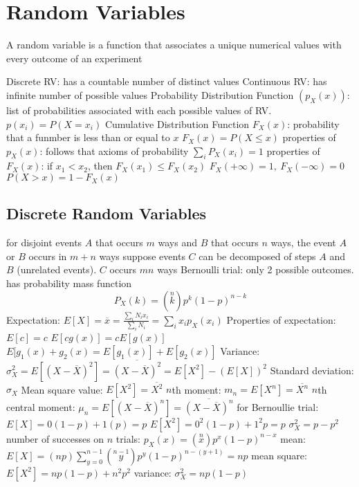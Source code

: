 \documentclass[a4paper,11pt]{article}
\begin{document}
	\section{Random Variables}
	A random variable is a function that associates a unique numerical values with every outcome of an experiment
	\begin{outline}[enumerate]
		\1 Discrete RV: has a countable number of distinct values
		\1 Continuous RV: has infinite number of possible values
		\1 Probability Distribution Function $(p_X(x))$: list of probabilities associated with each possible values of RV. 
		\1 $p(x_{i}) = P(X = x_{i})$ 
		\1 Cumulative Distribution Function $F_X(x)$: probability that a funmber is less than or equal to $x$ 
		\1 $F_X(x) = P(X \leq x)$
		\1 properties of $p_{X}(x)$:
			\2 follows that axioms of probability
			\2 $\sum_{i} P_X(x_{i}) = 1$
		\1 properties of $F_{X}(x)$:
			\2 if $x_{1} < x_{2}$, then $F_{X}(x_{1}) \leq F_{X}(x_{2})$
			\2 $F_{X}(+\infty) = 1,~ F_{X}(-\infty) = 0$
			\2 $P(X > x) = 1 - F_{X}(x)$
	\end{outline}

	\subsection{Discrete Random Variables}
	\begin{outline}[enumerate]
		\1 for disjoint events $A$ that occurs $m$ ways and $B$ that occurs $n$ ways, the event $A$ or $B$ occurs in $m + n$ ways 
		\1 suppose events $C$ can be decomposed of steps $A$ and $B$ (unrelated events). $C$ occurs $mn$ ways
		\1 Bernoulli trial: only 2 possible outcomes. has probability mass function 
		\begin{equation}
			P_{X}(k) = \left(\stackrel{n}{k}\right)p^{k}\left(1 - p\right)^{n - k}
		\end{equation}
		\1 Expectation: $E[X] = \overline{x} = \frac{\sum_{i} N_{i}x_{i}}{\sum_{i} N_{i}} = \sum_{i} x_{i}p_{X}(x_{i})$
		\1 Properties of expectation:
			\2 $E[c] = c$
			\2 $E[cg(x)] = cE[g(x)]$
			\2 $E[g_{1}(x) + g_{2}(x) = E[g_{1}(x)] + E[g_{2}(x)]$
		\1 Variance: $\sigma_{X}^2 = E\left[\left(X - \overline{X}\right)^{2}\right] = \overline{\left(X - \overline{X}\right)^{2}} = E\left[X^{2}\right] - \left(E\left[X\right]\right)^{2}$ 	
		\1 Standard deviation: $\sigma_{X}$
		\1 Mean square value: $E[X^{2}] = \overline{X^{2}}$
		\1 $n$th moment: $m_{n} = E\left[X^{n}\right] = \overline{X^{n}}$
		\1 $n$th central moment: $\mu_{n} = E\left[\left(X - \overline{X}\right)^{n}\right] = \overline{\left(X - \overline{X}\right)^{n}}$	
		\1 for Bernoullie trial:
			\2 $E\left[X\right] = 0(1 - p) + 1(p) = p$
			\2 $E\left[X^{2}\right] = 0^{2}(1 - p) + 1^{2}p = p$
			\2 $\sigma_{X}^{2} = p - p^{2}$
			\2 number of successes on $n$ trials: $p_{X}(x) = \left(\stackrel{n}{x}\right)p^{x}\left(1 - p\right)^{n - x}$
			\2 mean: $E\left[X\right] = (np)\sum\limits_{y = 0}^{n - 1} \left(\stackrel{n - 1}{y}\right)p^y\left(1 - p\right)^{n - \left(y + 1\right)} = np$
			\2 mean square: $E\left[X^{2}\right] = np\left(1 - p\right) + n^{2}p^{2}$
			\2 variance: $\sigma_{X}^{2} = np\left(1 - p\right)$
	\end{outline}
\end{document}
